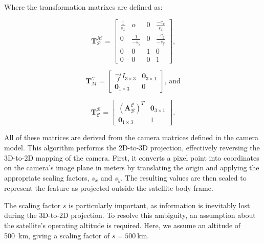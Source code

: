 \noindent
Where the transformation matrixes are defined as:

\begin{equation}
    \mathbf{T}_\mathcal{P}^\mathcal{M} = 
    \begin{bmatrix}
        \frac{1}{s_x}   & \alpha            & 0         & \frac{-c_x}{s_x} \\
        0               & \frac{1}{-s_y}    & 0         & \frac{-c_y}{-s_y} \\
        0               & 0                 & 1         & 0 \\
        0               & 0                 & 0         & 1        
    \end{bmatrix}
    \text{,}    
\end{equation}

\begin{equation}
    \mathbf{T}_\mathcal{M}^\mathcal{C} =
    \begin{bmatrix}
        \frac{-s}{f}I_{3\times3} & \boldsymbol{0}_{3\times1}\\
        \boldsymbol{0}_{1\times3} & 0
    \end{bmatrix}
    \text{, and}
\end{equation}

\begin{equation}
    \mathbf{T}_\mathcal{C}^\mathcal{B} = 
    \begin{bmatrix}
        (\mathbf{A}_\mathcal{B}^\mathcal{C})^T & \boldsymbol{0}_{3\times1} \\
         \boldsymbol{0}_{1\times3} & 1
    \end{bmatrix}
    \text{.}
\end{equation}


\noindent
All of these matrices are derived from the camera matrices defined in the camera model. This algorithm performs the 2D-to-3D projection, effectively reversing the 
3D-to-2D mapping of the camera. First, it converts a pixel point into coordinates on the camera's image plane in meters by translating the origin and applying the 
appropriate scaling factors, $s_x$ and $s_y$. The resulting values are then scaled to represent the feature as projected outside the satellite body frame.
\vspace{0.5cm}

\noindent
The scaling factor $s$ is particularly important, as information is inevitably lost during the 3D-to-2D projection. To resolve this ambiguity, an assumption about 
the satellite's operating altitude is required. Here, we assume an altitude of 500~km, giving a scaling factor of $s = 500~\text{km}$.


